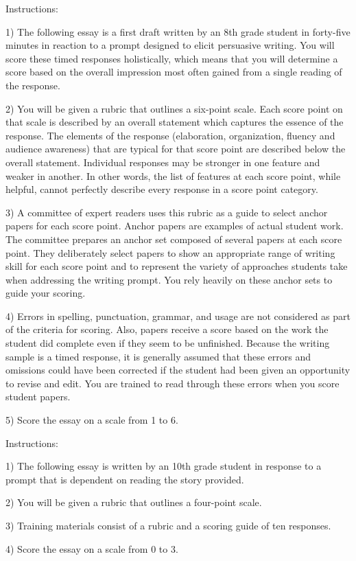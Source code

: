 \begin{tcolorbox}[title=Prompt 1 Holistic Context,breakable]
Instructions:

1) The following essay is a first draft written by an 8th grade student in forty-five minutes in reaction to a prompt designed to elicit persuasive writing. You will score these timed responses holistically, which means that you will determine a score based on the overall impression most often gained from a single reading of the response.

2) You will be given a rubric that outlines a six-point scale. Each score point on that scale is described by an overall statement which captures the essence of the response. The elements of the response (elaboration, organization, fluency and audience awareness) that are typical for that score point are described below the overall statement. Individual responses may be stronger in one feature and weaker in another. In other words, the list of features at each score point, while helpful, cannot perfectly describe every response in a score point category.

3) A committee of expert readers uses this rubric as a guide to select anchor papers for each score point. Anchor papers are examples of actual student work. The committee prepares an anchor set composed of several papers at each score point. They deliberately select papers to show an appropriate range of writing skill for each score point and to represent the variety of approaches students take when addressing the writing prompt. You rely heavily on these anchor sets to guide your scoring.

4) Errors in spelling, punctuation, grammar, and usage are not considered as part of the criteria for scoring. Also, papers receive a score based on the work the student did complete even if they seem to be unfinished. Because the writing sample is a timed response, it is generally assumed that these errors and omissions could have been corrected if the student had been given an opportunity to revise and edit. You are trained to read through these errors when you score student papers.

5) Score the essay on a scale from 1 to 6.
\end{tcolorbox}

\begin{tcolorbox}[title=Prompt 4 Holistic Context,breakable]
    Instructions:
    
1) The following essay is written by an 10th grade student in response to a prompt that is dependent on reading the story provided.

2) You will be given a rubric that outlines a four-point scale.

3) Training materials consist of a rubric and a scoring guide of ten responses.

4) Score the essay on a scale from 0 to 3.
\end{tcolorbox}

